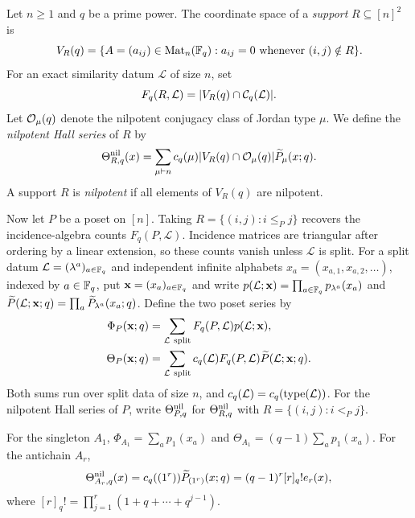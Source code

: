 \begin{definition}
\label{def:primary-series}\label{def:full-theta}\label{def:nilpotent-hall-series}
{
Let $n\geq1$ and $q$ be a prime power. The coordinate space of a \emph{support}
$R\subseteq[n]^2$ is
\[
 V_R(q)=\{A=(a_{ij})\in\operatorname{Mat}_n(\mathbb F_q):a_{ij}=0\text{ whenever }(i,j)\notin R\}.
\]
For an exact similarity datum $\mathcal L$ of size $n$, set
\[
 F_q(R,\mathcal L)=|V_R(q)\cap\mathcal C_q(\mathcal L)|.
\]
Let $\mathcal O_{\mu}(q)$ denote the nilpotent conjugacy class of Jordan type
$\mu$. We define the \emph{nilpotent Hall series} of $R$ by
\begin{equation}
 \Theta^{\mathrm{nil}}_{R,q}(x)=\sum_{\mu\vdash n}c_q(\mu)
       |V_R(q)\cap\mathcal O_{\mu}(q)|\widetilde P_\mu(x;q).
 \label{eq:fieldwise-nilpotent-hall-series}
\end{equation}
A support $R$ is \emph{nilpotent} if all elements of $V_R(q)$ are nilpotent.

Now let $P$ be a poset on $[n]$. Taking $R=\{(i,j):i\leq_P j\}$
recovers the incidence-algebra counts $F_q(P,\mathcal L)$.
Incidence matrices are triangular after ordering by a linear extension,
so these counts vanish unless $\mathcal L$ is split.
For a split datum $\mathcal L=(\lambda^a)_{a\in\mathbb F_q}$ and independent
infinite alphabets $x_a=(x_{a,1},x_{a,2},\ldots)$, indexed by
$a\in\mathbb F_q$, put $\mathbf x=(x_a)_{a\in\mathbb F_q}$ and write
$p(\mathcal L;\mathbf x)=\prod_{a\in\mathbb F_q}p_{\lambda^a}(x_a)$ and
$\widetilde P(\mathcal L;\mathbf x;q)=\prod_a\widetilde P_{\lambda^a}(x_a;q)$.
Define the two poset series by
\begin{align}
 \Phi_P(\mathbf x;q)&=\sum_{\mathcal L\ \text{split}}F_q(P,\mathcal L)
                      p(\mathcal L;\mathbf x),\label{eq:full-phi}\\
 \Theta_P(\mathbf x;q)&=\sum_{\mathcal L\ \text{split}}c_q(\mathcal L)
      F_q(P,\mathcal L)\widetilde P(\mathcal L;\mathbf x;q).\label{eq:full-theta}
\end{align}
Both sums run over split data of size $n$, and
$c_q(\mathcal L)=c_q(\operatorname{type}(\mathcal L))$.
For the nilpotent Hall series of $P$, write $\Theta^{\mathrm{nil}}_{P,q}$ for
$\Theta^{\mathrm{nil}}_{R,q}$ with $R=\{(i,j):i<_P j\}$.
}
\end{definition}
\begin{example}
\label{ex:singleton-antichain-series}
For the singleton $A_1$, $\Phi_{A_1}=\sum_a p_1(x_a)$ and
$\Theta_{A_1}=(q-1)\sum_a p_1(x_a)$. For the antichain $A_r$,
{
\[
 \Theta^{\mathrm{nil}}_{A_r,q}(x)=c_q((1^r))\widetilde P_{(1^r)}(x;q)
 =(q-1)^r[r]_q!e_r(x),
\]
}
where
$[r]_q!=\prod_{j=1}^r(1+q+\cdots+q^{j-1})$.
\end{example}


